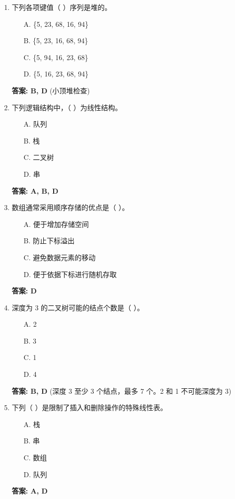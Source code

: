 \documentclass[12pt, a4paper]{article}
\begin{document}
\begin{enumerate}
    \item 下列各项键值（ ）序列是堆的。
    \begin{enumerate}
        \item[A.] \{5, 23, 68, 16, 94\}
        \item[B.] \{5, 23, 16, 68, 94\}
        \item[C.] \{5, 94, 16, 23, 68\}
        \item[D.] \{5, 16, 23, 68, 94\}
    \end{enumerate}
    \textbf{答案: B, D} (小顶堆检查)

    \item 下列逻辑结构中，（ ）为线性结构。
    \begin{enumerate}
        \item[A.] 队列
        \item[B.] 栈
        \item[C.] 二叉树
        \item[D.] 串
    \end{enumerate}
    \textbf{答案: A, B, D}

    \item 数组通常采用顺序存储的优点是（ ）。
    \begin{enumerate}
        \item[A.] 便于增加存储空间
        \item[B.] 防止下标溢出
        \item[C.] 避免数据元素的移动
        \item[D.] 便于依据下标进行随机存取
    \end{enumerate}
    \textbf{答案: D}

    \item 深度为 3 的二叉树可能的结点个数是（ ）。
    \begin{enumerate}
        \item[A.] 2
        \item[B.] 3
        \item[C.] 1
        \item[D.] 4
    \end{enumerate}
    \textbf{答案: B, D} (深度 3 至少 3 个结点，最多 7 个。2 和 1 不可能深度为 3)

    \item 下列（ ）是限制了插入和删除操作的特殊线性表。
    \begin{enumerate}
        \item[A.] 栈
        \item[B.] 串
        \item[C.] 数组
        \item[D.] 队列
    \end{enumerate}
    \textbf{答案: A, D}


\end{enumerate}
\end{document}
